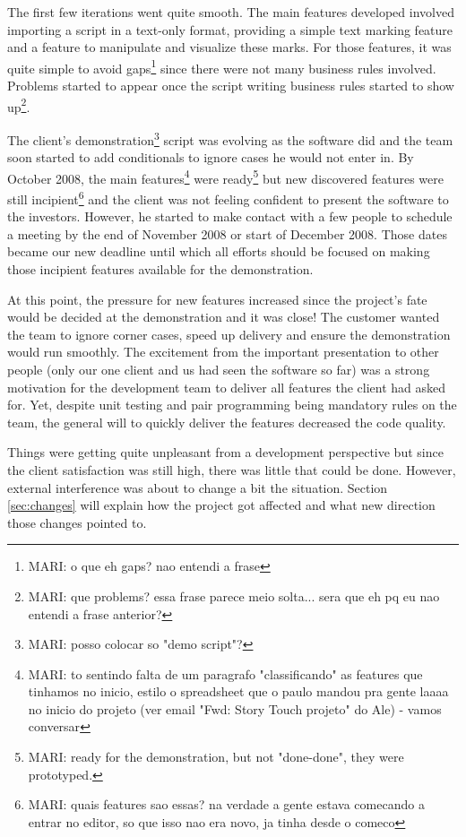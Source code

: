 \documentclass[lnbip]{svmultln}
\newcommand{\mari}[1]{\footnote{MARI: #1}}
\begin{document}
The first few iterations went quite smooth. The main features developed involved importing a script in a text-only format, providing a simple text marking feature and a feature to manipulate and visualize these marks. For those features, it was quite simple to avoid gaps\mari{o que eh gaps? nao entendi a frase} since there were not many business rules involved. Problems started to appear once the script writing business rules started to show up\mari{que problems? essa frase parece meio solta... sera que eh pq eu nao entendi a frase anterior?}.

The client's demonstration\mari{posso colocar so "demo script"?} script was evolving as the software did and the team soon started to add conditionals to ignore cases he would not enter in. By October 2008, the main features\mari{to sentindo falta de um paragrafo "classificando" as features que tinhamos no inicio, estilo o spreadsheet que o paulo mandou pra gente laaaa no inicio do projeto (ver email "Fwd: Story Touch projeto" do Ale) - vamos conversar} were ready\mari{ready for the demonstration, but not "done-done", they were prototyped.} but new discovered features were still incipient\mari{quais features sao essas? na verdade a gente estava comecando a entrar no editor, so que isso nao era novo, ja tinha desde o comeco} and the client was not feeling confident to present the software to the investors. However, he started to make contact with a few people to schedule a meeting by the end of November 2008 or start of December 2008. Those dates became our new deadline until which all efforts should be focused on making those incipient features available for the demonstration.

At this point, the pressure for new features increased since the project's fate would be decided at the demonstration and it was close! The customer wanted the team to ignore corner cases, speed up delivery and ensure the demonstration would run smoothly. The excitement from the important presentation to other people (only our one client and us had seen the software so far) was a strong motivation for the development team to deliver all features the client had asked for. Yet, despite unit testing and pair programming being mandatory rules on the team, the general will to quickly deliver the features decreased the code quality.

Things were getting quite unpleasant from a development perspective but since the client satisfaction was still high, there was little that could be done. However, external interference was about to change a bit the situation. Section \ref{sec:changes} will explain how the project got affected and what new direction those changes pointed to.
\end{document}
